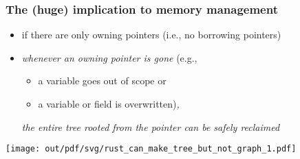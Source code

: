\documentclass[12pt,dvipdfmx]{beamer}
\newcommand{\ao}[1]{{\color{blue}#1}}
\begin{document}
\begin{frame}
  \frametitle{The (huge) implication to memory management}
  \begin{itemize}
  \item if there are only owning pointers (i.e., no 
    borrowing pointers)
  \item \ao{\it whenever an owning pointer is gone} (e.g., 
    \begin{itemize}
    \item a variable goes out of scope or
    \item a variable or field is overwritten)\ao{\it ,}
    \end{itemize}
    \ao{\it the entire tree rooted from the pointer can be safely reclaimed}
  \end{itemize}
  \begin{center}
    \texttt{[image: out/pdf/svg/rust\_can\_make\_tree\_but\_not\_graph\_1.pdf]}
  \end{center}
\end{frame}



  \iffalse
\begin{frame}[fragile]
  \frametitle{A (huge) implication of the single-owner rule (2)}
  \begin{itemize}
  \item with only owning pointers, {\it no two names in scope
      ever refer to the same object} ({\it no aliasing})
    
  \item {\tt a} and {\tt b} below {\it never} refer to the same object
    \begin{lstlisting}
fn take_two(a : Box<@$T$@>, b : Box<@$T$@>) {
  ...
}        
\end{lstlisting}

\item a boon for the compiler
\item a useful property to avoid mistakes, too
\end{itemize}
\end{frame}
\fi

\end{document}
